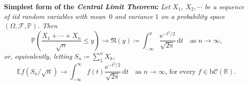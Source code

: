 \documentclass{article}
\def\Pr{\ensuremath{\mathbb{P}}}
\begin{document}
\begin{description}
\textbf{Simplest form of the \textit{Central Limit Theorem}:} \textit{Let
$X_1$, $X_2,\cdots$ be a sequence of iid random variables with mean~$0$ 
and variance $1$ on a probability space $(\Omega,\mathscr{F},\Pr)$. Then}
\[\Pr\left(\frac{X_1+\cdots+X_n}{\sqrt{n}}\le y\right)\to\mathfrak{N}(y)\coloneq
\int_{-\infty}^y \frac{\mathrm{e}^{-t^2/2}}{\sqrt{2\mathrm{\pi}}}\,
\mathrm{d}t\quad\mbox{as $n\to\infty$,}\]
\textit{or, equivalently, letting} $S_n\coloneq\sum_1^n X_k$,
\[\mathbb{E} f\left(S_n/\sqrt{n}\right)\to \int_{-\infty}^\infty f(t)
\frac{\mathrm{e}^{-t^2/2}}{\sqrt{2\mathrm{\pi}}}\,\mathrm{d}t
\quad\mbox{as $n\to\infty$, for every $f\in\mathrm{b}
\mathscr{C}(\mathbb{R})$.}\]
\end{description}
\end{document}
